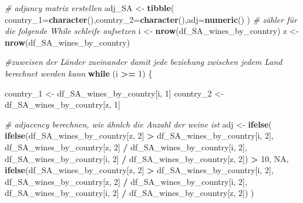 \documentclass[
]{article}
\newenvironment{Shaded}{\begin{snugshade}}{\end{snugshade}}
\newcommand{\AttributeTok}[1]{\textcolor[rgb]{0.13,0.29,0.53}{#1}}
\newcommand{\CommentTok}[1]{\textcolor[rgb]{0.56,0.35,0.01}{\textit{#1}}}
\newcommand{\ConstantTok}[1]{\textcolor[rgb]{0.56,0.35,0.01}{#1}}
\newcommand{\ControlFlowTok}[1]{\textcolor[rgb]{0.13,0.29,0.53}{\textbf{#1}}}
\newcommand{\DecValTok}[1]{\textcolor[rgb]{0.00,0.00,0.81}{#1}}
\newcommand{\FunctionTok}[1]{\textcolor[rgb]{0.13,0.29,0.53}{\textbf{#1}}}
\newcommand{\NormalTok}[1]{#1}
\newcommand{\OtherTok}[1]{\textcolor[rgb]{0.56,0.35,0.01}{#1}}
\newcommand{\SpecialCharTok}[1]{\textcolor[rgb]{0.81,0.36,0.00}{\textbf{#1}}}
\begin{document}
\begin{Shaded}
\begin{Highlighting}[]
\CommentTok{\# adjancy matrix erstellen}
\NormalTok{adj\_SA }\OtherTok{\textless{}{-}} \FunctionTok{tibble}\NormalTok{( }\AttributeTok{country\_1=}\FunctionTok{character}\NormalTok{(),}\AttributeTok{country\_2=}\FunctionTok{character}\NormalTok{(),}\AttributeTok{adj=}\FunctionTok{numeric}\NormalTok{()}
\NormalTok{)}
\CommentTok{\# zähler für die folgende While schleife aufsetzen}
\NormalTok{i }\OtherTok{\textless{}{-}} \FunctionTok{nrow}\NormalTok{(df\_SA\_wines\_by\_country)}
\NormalTok{z }\OtherTok{\textless{}{-}} \FunctionTok{nrow}\NormalTok{(df\_SA\_wines\_by\_country)}

\CommentTok{\#zuweisen der Länder zueinander damit jede beziehung zwischen jedem Land berechnet werden kann }
\ControlFlowTok{while}\NormalTok{ (i }\SpecialCharTok{\textgreater{}=} \DecValTok{1}\NormalTok{) \{  }

\NormalTok{  country\_1 }\OtherTok{\textless{}{-}}\NormalTok{ df\_SA\_wines\_by\_country[i, }\DecValTok{1}\NormalTok{]}
\NormalTok{  country\_2 }\OtherTok{\textless{}{-}}\NormalTok{ df\_SA\_wines\_by\_country[z, }\DecValTok{1}\NormalTok{]}

  \CommentTok{\# adjacency berechnen, wie ähnlch die Anzahl der weine ist}
\NormalTok{  adj }\OtherTok{\textless{}{-}} \FunctionTok{ifelse}\NormalTok{(}
    \FunctionTok{ifelse}\NormalTok{(df\_SA\_wines\_by\_country[z, }\DecValTok{2}\NormalTok{] }\SpecialCharTok{\textgreater{}}\NormalTok{ df\_SA\_wines\_by\_country[i, }\DecValTok{2}\NormalTok{],}
\NormalTok{           df\_SA\_wines\_by\_country[z, }\DecValTok{2}\NormalTok{] }\SpecialCharTok{/}\NormalTok{ df\_SA\_wines\_by\_country[i, }\DecValTok{2}\NormalTok{],}
\NormalTok{           df\_SA\_wines\_by\_country[i, }\DecValTok{2}\NormalTok{] }\SpecialCharTok{/}\NormalTok{ df\_SA\_wines\_by\_country[z, }\DecValTok{2}\NormalTok{]) }\SpecialCharTok{\textgreater{}} \DecValTok{10}\NormalTok{,}
    \ConstantTok{NA}\NormalTok{,}
    \FunctionTok{ifelse}\NormalTok{(df\_SA\_wines\_by\_country[z, }\DecValTok{2}\NormalTok{] }\SpecialCharTok{\textgreater{}}\NormalTok{ df\_SA\_wines\_by\_country[i, }\DecValTok{2}\NormalTok{],}
\NormalTok{           df\_SA\_wines\_by\_country[z, }\DecValTok{2}\NormalTok{] }\SpecialCharTok{/}\NormalTok{ df\_SA\_wines\_by\_country[i, }\DecValTok{2}\NormalTok{],}
\NormalTok{           df\_SA\_wines\_by\_country[i, }\DecValTok{2}\NormalTok{] }\SpecialCharTok{/}\NormalTok{ df\_SA\_wines\_by\_country[z, }\DecValTok{2}\NormalTok{])}
\NormalTok{  )}


\end{Highlighting}
\end{Shaded}
\end{document}
